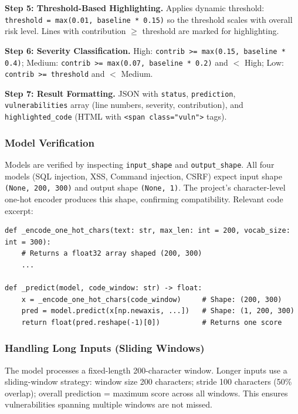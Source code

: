 \textbf{Step 5: Threshold-Based Highlighting.} Applies dynamic threshold: \texttt{threshold = max(0.01, baseline * 0.15)} so the threshold scales with overall risk level. Lines with contribution $\ge$ threshold are marked for highlighting.

\textbf{Step 6: Severity Classification.} High: \texttt{contrib >= max(0.15, baseline * 0.4)}; Medium: \texttt{contrib >= max(0.07, baseline * 0.2)} and $<$ High; Low: \texttt{contrib >= threshold} and $<$ Medium.

\textbf{Step 7: Result Formatting.} JSON with \texttt{status}, \texttt{prediction}, \texttt{vulnerabilities} array (line numbers, severity, contribution), and \texttt{highlighted\_code} (HTML with \texttt{<span class="vuln">} tags).

\subsubsection{Model Verification}
\label{sec:ml_model_verification}

Models are verified by inspecting \texttt{input\_shape} and \texttt{output\_shape}. All four models (SQL injection, XSS, Command injection, CSRF) expect input shape \texttt{(None, 200, 300)} and output shape \texttt{(None, 1)}. The project's character-level one-hot encoder produces this shape, confirming compatibility. Relevant code excerpt:

\begin{lstlisting}[style=pycode]
def _encode_one_hot_chars(text: str, max_len: int = 200, vocab_size: int = 300):
    # Returns a float32 array shaped (200, 300)
    ...

def _predict(model, code_window: str) -> float:
    x = _encode_one_hot_chars(code_window)     # Shape: (200, 300)
    pred = model.predict(x[np.newaxis, ...])   # Shape: (1, 200, 300)
    return float(pred.reshape(-1)[0])          # Returns one score
\end{lstlisting}

\subsubsection{Handling Long Inputs (Sliding Windows)}
\label{sec:ml_sliding_windows}

The model processes a fixed-length 200-character window. Longer inputs use a sliding-window strategy: window size 200 characters; stride 100 characters (50\% overlap); overall prediction = maximum score across all windows. This ensures vulnerabilities spanning multiple windows are not missed.

